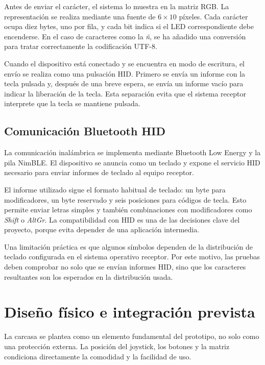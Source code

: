 Antes de enviar el carácter, el sistema lo muestra en la matriz RGB. La representación se realiza mediante una fuente de \(6 \times 10\) píxeles. Cada carácter ocupa diez bytes, uno por fila, y cada bit indica si el LED correspondiente debe encenderse. En el caso de caracteres como la \textit{ñ}, se ha añadido una conversión para tratar correctamente la codificación UTF-8.

Cuando el dispositivo está conectado y se encuentra en modo de escritura, el envío se realiza como una pulsación HID. Primero se envía un informe con la tecla pulsada y, después de una breve espera, se envía un informe vacío para indicar la liberación de la tecla. Esta separación evita que el sistema receptor interprete que la tecla se mantiene pulsada.

\subsection{Comunicación Bluetooth HID}
\label{subsec:bluetooth-hid-nuevo}

La comunicación inalámbrica se implementa mediante Bluetooth Low Energy y la pila NimBLE. El dispositivo se anuncia como un teclado y expone el servicio HID necesario para enviar informes de teclado al equipo receptor.

El informe utilizado sigue el formato habitual de teclado: un byte para modificadores, un byte reservado y seis posiciones para códigos de tecla. Esto permite enviar letras simples y también combinaciones con modificadores como \textit{Shift} o \textit{AltGr}. La compatibilidad con HID es una de las decisiones clave del proyecto, porque evita depender de una aplicación intermedia.

Una limitación práctica es que algunos símbolos dependen de la distribución de teclado configurada en el sistema operativo receptor. Por este motivo, las pruebas deben comprobar no solo que se envían informes HID, sino que los caracteres resultantes son los esperados en la distribución usada.

\section{Diseño físico e integración prevista}
\label{sec:diseno-fisico-integracion}

La carcasa se plantea como un elemento fundamental del prototipo, no solo como una protección externa. La posición del joystick, los botones y la matriz condiciona directamente la comodidad y la facilidad de uso.


